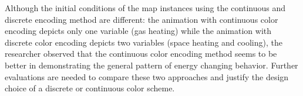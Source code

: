 Although the initial conditions of the map instances using the
continuous and discrete encoding method are different: the animation
with continuous color encoding depicts only one variable (gas heating)
while the animation with discrete color encoding depicts two variables
(space heating and cooling), the researcher observed that the
continuous color encoding method seems to be better in demonstrating
the general pattern of energy changing behavior. Further evaluations
are needed to compare these two approaches and justify the design
choice of a discrete or continuous color scheme.

\begin{comment}
\section{Future Trends}
Harrower and Fabrikant mentioned that the chanllenge of using animated
maps is the overflow of information and the vulnerability to
distraction~\cite{Harrower2008}. One example mentioned by Harrower and
Fabrikant is the comparison of color on the map and that on the legend
becomes difficult for animated maps as a result of the changing of
images. They proposed the audio legend approach of strengthening
information convey with minimized
distraction~\cite{Harrower2008}. This might become one of the next
extensions of the current Dynamic Energy Map interface design.

They also suggested that the difference in time should have different
visual representations in data display~\cite{Harrower2008}. Peuquet
claimed that ``The development of temporal analytical capabilities in
GIS such as temporal queries requires basic topological structures in
both time and space''~\cite{Peuquet1994}. Thus the different spatial
representation seems to be a natural choice for adapting to different
temporal resolution and scale.


The non-interactive animation could be found
\href{http://www.armechxyj.com/energy-mapping.html#redblueAnime3d}{through
  this link}.
\end{comment}